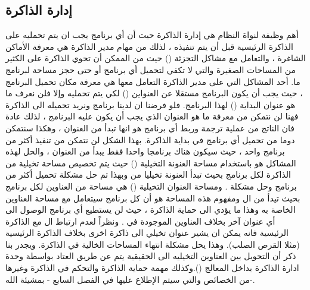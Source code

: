 \documentclass[document.tex]{subfiles}
\begin{document}
\subsection{إدارة الذاكرة}
أهم وظيفة لنواة النظام هي إدارة الذاكرة حيث أن أي برنامج يجب ان يتم تحمليه على الذاكرة الرئيسية قبل أن يتم تنفيذه ، لذلك من مهام مدير الذاكرة هي معرفة الأماكن الشاغرة ، والتعامل مع مشاكل التجزئة () حيث من الممكن أن تحوي الذاكرة على الكثير من المساحات الصغيرة والتي لا تكفي لتحميل أي برنامج أو حتى حجز مساحة لبرنامج ما.
أحد المشاكل التي على مدير الذاكرة التعامل معها هي معرفة مكان تحميل البرنامج ، حيث يجب أن يكون البرنامج مستقلا عن العنواين  () لكي يتم تحمليه  وإلا فلن نعرف ما هو عنوان البداية () لهذا البرنامج.
فلو فرضنا ان لدينا برنامج  ونريد تحميله الى الذاكرة فهنا لن نتمكن من معرفة ما هو العنوان الذي يجب أن يكون عليه البرنامج ، لذلك عادة فان الناتج من عملية ترجمة وربط أي برنامج هو انها تبدأ من العنوان ، وهكذا سنتمكن دوما من تحميل أي برنامج في بداية الذاكرة.
بهذا الشكل لن نتمكن من تنفيذ أكثر من برنامج واحد ، حيث سيكون هناك برنامجا واحدا فقط يبدأ من العنوان  ، والحل لهذه المشاكل هو باستخدام مساحة العنونة التخيلية () حيث يتم تخصيص مساحة تخيلية من الذاكرة لكل برنامج بحيث تبدأ العنونة تخيليا من  وبهذا تم حل مشكلة تحميل أكثر من برنامج وحل مشكلة .
ومساحة العنوان التخيلية () هي مساحة من العناوين لكل برنامج بحيث تيدأ من ال  ومفهوم هذه المساحة هو أن كل برنامج سيتعامل مع مساحة العناوين الخاصة به وهذا ما يؤدي الى حماية الذاكرة ، حيث لن يستطيع أي برنامج الوصول الى أي عنوان آخر بخلاف العناوين الموجودة في .
ونظراً لعدم ارتباط ال  مع الذاكرة الرئيسية فانه يمكن ان يشير عنوان تخيلي الى ذاكرة اخرى بخلاف الذاكرة الرئيسية (مثلا القرص الصلب). وهذا يحل مشكلة انتهاء المساحات الخالية في الذاكرة.
ويجدر بنا ذكر أن التحويل بين العناوين التخيليه الى الحقيقية يتم عن طريق العتاد بواسطة وحدة ادارة الذاكرة بداخل المعالج ().وكذلك مهمة حماية الذاكرة والتحكم في الذاكرة  وغيرها من الخصائص والتي سيتم الإطلاع عليها في الفصل السابع - بمشيئة الله-.



\end{document}
